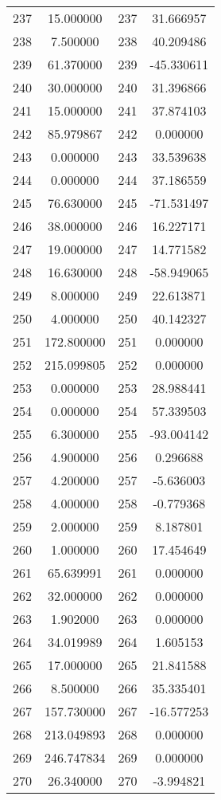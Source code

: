 \documentclass[12pt]{article}
\begin{document}
\begin{longtable}{@{}cccc@{}}
237 & 15.000000 & 237 & 31.666957 \\
238 & 7.500000 & 238 & 40.209486 \\
239 & 61.370000 & 239 & -45.330611 \\
240 & 30.000000 & 240 & 31.396866 \\
241 & 15.000000 & 241 & 37.874103 \\
242 & 85.979867 & 242 & 0.000000 \\
243 & 0.000000 & 243 & 33.539638 \\
244 & 0.000000 & 244 & 37.186559 \\
245 & 76.630000 & 245 & -71.531497 \\
246 & 38.000000 & 246 & 16.227171 \\
247 & 19.000000 & 247 & 14.771582 \\
248 & 16.630000 & 248 & -58.949065 \\
249 & 8.000000 & 249 & 22.613871 \\
250 & 4.000000 & 250 & 40.142327 \\
251 & 172.800000 & 251 & 0.000000 \\
252 & 215.099805 & 252 & 0.000000 \\
253 & 0.000000 & 253 & 28.988441 \\
254 & 0.000000 & 254 & 57.339503 \\
255 & 6.300000 & 255 & -93.004142 \\
256 & 4.900000 & 256 & 0.296688 \\
257 & 4.200000 & 257 & -5.636003 \\
258 & 4.000000 & 258 & -0.779368 \\
259 & 2.000000 & 259 & 8.187801 \\
260 & 1.000000 & 260 & 17.454649 \\
261 & 65.639991 & 261 & 0.000000 \\
262 & 32.000000 & 262 & 0.000000 \\
263 & 1.902000 & 263 & 0.000000 \\
264 & 34.019989 & 264 & 1.605153 \\
265 & 17.000000 & 265 & 21.841588 \\
266 & 8.500000 & 266 & 35.335401 \\
267 & 157.730000 & 267 & -16.577253 \\
268 & 213.049893 & 268 & 0.000000 \\
269 & 246.747834 & 269 & 0.000000 \\
270 & 26.340000 & 270 & -3.994821 \\

\end{longtable}
\end{document}
